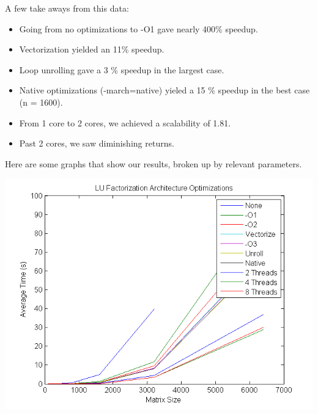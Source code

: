 \documentclass[12]{article}
\begin{document}
A few take aways from this data:

\begin{itemize}
\setlength\itemsep{0.25em}
\item Going from no optimizations to -O1 gave nearly 400\% speedup.  
\item Vectorization yielded an 11\% speedup.
\item Loop unrolling gave a 3 \% speedup in the largest case.
\item Native optimizations (-march=native) yieled a 15 \% speedup in the best case (n = 1600).  
\item From 1 core to 2 cores, we achieved a scalability of 1.81. 
\item Past 2 cores, we saw diminishing returns.  
\end{itemize}

Here are some graphs that show our results, broken up by relevant parameters.  

\includegraphics[scale=1]{figures/fig1}
\end{document}
